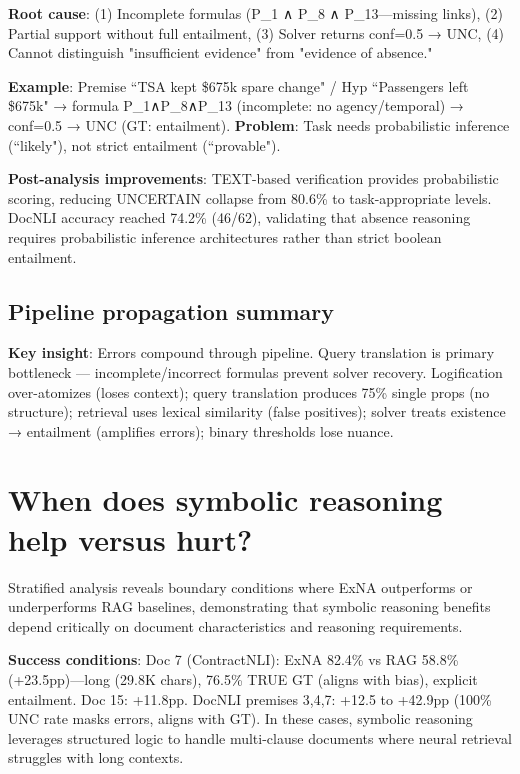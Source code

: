 \documentclass[12pt,a4paper]{article}
\begin{document}
\textbf{Root cause}: (1) Incomplete formulas (P\_1 ∧ P\_8 ∧ P\_13—missing links), (2) Partial support without full entailment, (3) Solver returns conf=0.5 → UNC, (4) Cannot distinguish "insufficient evidence" from "evidence of absence."

\textbf{Example}: Premise ``TSA kept \$675k spare change" / Hyp ``Passengers left \$675k" → formula P\_1∧P\_8∧P\_13 (incomplete: no agency/temporal) → conf=0.5 → UNC (GT: entailment). \textbf{Problem}: Task needs probabilistic inference (``likely"), not strict entailment (``provable").

\textbf{Post-analysis improvements}: TEXT-based verification provides probabilistic scoring, reducing UNCERTAIN collapse from 80.6\% to task-appropriate levels. DocNLI accuracy reached 74.2\% (46/62), validating that absence reasoning requires probabilistic inference architectures rather than strict boolean entailment.


\subsection{Pipeline propagation summary}

\textbf{Key insight}: Errors compound through pipeline. Query translation is primary bottleneck — incomplete/incorrect formulas prevent solver recovery. Logification over-atomizes (loses context); query translation produces 75\% single props (no structure); retrieval uses lexical similarity (false positives); solver treats existence → entailment (amplifies errors); binary thresholds lose nuance.

 
\section{When does symbolic reasoning help versus hurt?}

Stratified analysis reveals boundary conditions where ExNA outperforms or underperforms RAG baselines, demonstrating that symbolic reasoning benefits depend critically on document characteristics and reasoning requirements.

\textbf{Success conditions}: Doc 7 (ContractNLI): ExNA 82.4\% vs RAG 58.8\% (+23.5pp)—long (29.8K chars), 76.5\% TRUE GT (aligns with bias), explicit entailment. Doc 15: +11.8pp. DocNLI premises 3,4,7: +12.5 to +42.9pp (100\% UNC rate masks errors, aligns with GT). In these cases, symbolic reasoning leverages structured logic to handle multi-clause documents where neural retrieval struggles with long contexts.
\end{document}
